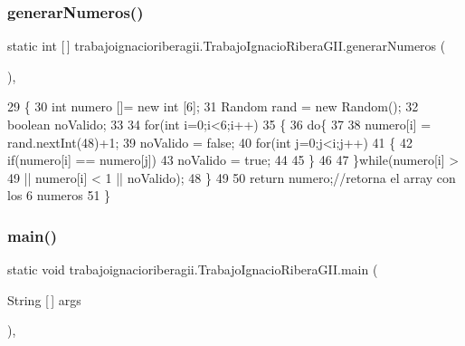 \subsubsection{\texorpdfstring{generar\+Numeros()}{generarNumeros()}}
{\footnotesize\ttfamily static int \mbox{[}$\,$\mbox{]} trabajoignacioriberagii.\+Trabajo\+Ignacio\+Ribera\+G\+I\+I.\+generar\+Numeros (\begin{DoxyParamCaption}{ }\end{DoxyParamCaption})\hspace{0.3cm}{\ttfamily [inline]}, {\ttfamily [static]}}


\begin{DoxyCode}
29     \{
30         \textcolor{keywordtype}{int} numero []= \textcolor{keyword}{new} \textcolor{keywordtype}{int} [6];
31         Random rand = \textcolor{keyword}{new} Random();
32         \textcolor{keywordtype}{boolean} noValido;
33     
34     \textcolor{keywordflow}{for}(\textcolor{keywordtype}{int} i=0;i<6;i++)
35     \{
36         \textcolor{keywordflow}{do}\{
37     
38                     numero[i] = rand.nextInt(48)+1;
39                     noValido = \textcolor{keyword}{false};
40                     \textcolor{keywordflow}{for}(\textcolor{keywordtype}{int} j=0;j<i;j++)
41                     \{
42                         \textcolor{keywordflow}{if}(numero[i] == numero[j])
43                             noValido = \textcolor{keyword}{true};
44                             
45                     \}
46     
47         \}\textcolor{keywordflow}{while}(numero[i] > 49 || numero[i] < 1 || noValido);
48     \}
49         
50         \textcolor{keywordflow}{return} numero;\textcolor{comment}{//retorna el array con los 6 numeros}
51     \}
\end{DoxyCode}
\mbox{\label{classtrabajoignacioriberagii_1_1_trabajo_ignacio_ribera_g_i_i_a19df64b4b484ec115a402f5b1c4430ef}} 
\subsubsection{\texorpdfstring{main()}{main()}}
{\footnotesize\ttfamily static void trabajoignacioriberagii.\+Trabajo\+Ignacio\+Ribera\+G\+I\+I.\+main (\begin{DoxyParamCaption}\item[{String \mbox{[}$\,$\mbox{]}}]{args }\end{DoxyParamCaption})\hspace{0.3cm}{\ttfamily [inline]}, {\ttfamily [static]}}


